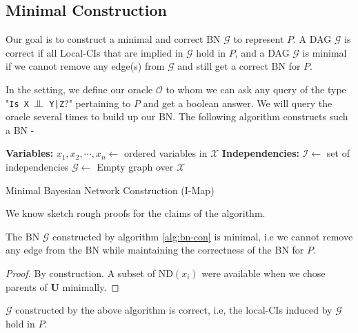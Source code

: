 \subsection{Minimal Construction}
Our goal is to construct a minimal and correct BN $\mathcal G$ to represent $P$. A DAG $\mathcal G$ is correct if all Local-CIs that are implied in $\mathcal G$ hold in $P$, and a DAG $\mathcal G$ is minimal if we cannot remove any edge(s) from $\mathcal G$ and still get a correct BN for $P$.

 In the setting, we define our oracle $\mathscr{O}$ to whom we can ask any query of the type "\texttt{Is X $\ind$ Y|Z}?" pertaining to $P$ and get a boolean answer. We will query the oracle several times to build up our BN. The following algorithm constructs such a BN - \\
\begin{algorithm}[H]\label{alg:bn-con}
	\DontPrintSemicolon
	\textbf{Variables:} $x_1, x_2, \cdots, x_n \longleftarrow$ ordered variables in $\mathcal{X}$\;
	\textbf{Independencies:} $\mathcal I \longleftarrow$ set of independencies\;
	$\mathcal G \longleftarrow$ Empty graph over $\mathcal X$\;
	
	\caption{Minimal Bayesian Network Construction (I-Map)}
\end{algorithm}
We know sketch rough proofs for the claims of the algorithm.
\begin{thm}
The BN $\mathcal G$ constructed by algorithm \ref{alg:bn-con} is minimal, i.e we cannot remove any edge from the BN while maintaining the correctness of the BN for $P$.
\end{thm}
\begin{proof}
By construction. A subset of $\text{ND}(x_i)$ were available when we chose parents of $\mathbf U$ minimally.
\end{proof}
\begin{thm}
$\mathcal{G}$ constructed by the above algorithm is correct, i.e, the local-CIs induced by $\mathcal G$ hold in $P$.
\end{thm}
